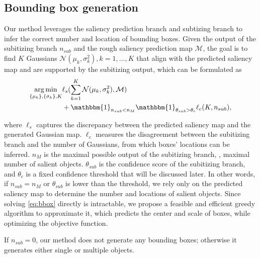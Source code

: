 \documentclass[10pt,twocolumn,letterpaper]{article}
\newcommand{\ignore}[1]{}
\DeclareMathOperator*{\argmin}{arg\,min}
\begin{document}
\subsection{Bounding box generation}
{Our method leverages the saliency prediction branch and subtizing branch to infer the correct number and location of bounding boxes. Given the output of the subitizing branch $n_{sub}$ and the rough saliency prediction map $\mathcal{M}$, the goal is to find $K$ Gaussians $\mathcal{N}(\mu_k, \sigma_k^2), k=1,\dots,K$ that align with the predicted saliency map and are supported by the subitizing output, which can be formulated as
}
\begin{align}
\argmin_{\{\mathbf{\mu}_k\},\{\mathbf{\sigma}_k\},K} &\ell_{s}(\sum_{k=1}^K \mathcal{N}(\mu_k, \sigma_k^2),\mathcal{M})\nonumber \\
& +\mathbbm{1}_{n_{sub}<n_{M}}
\mathbbm{1}_{\theta_{sub}>\theta_c}\ell_c(K,n_{sub}),
\label{eq:bbox}
\end{align}
{where $\ell_s$ captures the discrepancy between the predicted saliency map and the generated Gaussian map. $\ell_c$ measures the disagreement between the subitizing branch and the number of Gaussians, from which boxes' locations can be inferred. $n_M$ is the maximal possible output of the subitizing branch, \ie, maximal number of salient objects. $\theta_{sub}$ is the confidence score of the subitizing branch, and $\theta_c$ is a fixed confidence threshold that will be discussed later. In other words, if $n_{sub}= n_M$ or $\theta_{sub}$ is lower than the threshold, we rely only on the predicted saliency map to determine the number and locations of salient objects.
Since solving \eqref{eq:bbox} directly is intractable, we propose a feasible and efficient greedy algorithm to approximate it, which predicts the center and scale of boxes, while optimizing the objective function. 
\ignore{In section \ref{sec:single_detection}, we present the algorithm assuming a single object inside the image and generalize the algorithm for multiple objects in section \ref{sec:multi_detection}. Moreover to tackle the \emph{existence} sub-problem, we use the output of subitizing branch $n_{sub}$ and do not generate any bounding boxes if $n_{sub}=0$.}
If $n_{sub}=0$, our method does not generate any bounding boxes; otherwise it generates either single or multiple objects.
}
\end{document}

